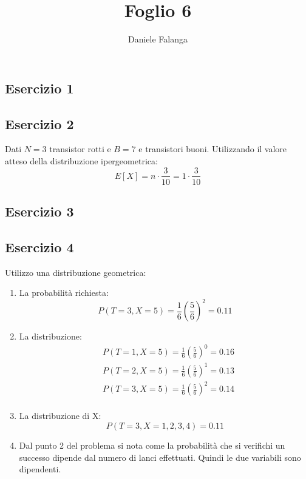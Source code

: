 \documentclass[12pt]{article}
\title{\textbf{Foglio 6}}
\author{Daniele Falanga}
\date{}
\begin{document}
\maketitle

\subsection*{Esercizio 1}

\subsection*{Esercizio 2}

Dati \(N = 3\) transistor rotti e \(B = 7\) e transistori buoni.
Utilizzando il valore atteso della distribuzione ipergeometrica:
\[
E[X] = n \cdot \frac{3}{10} = 1 \cdot \frac{3}{10}    
\] 

\subsection*{Esercizio 3}

\subsection*{Esercizio 4}
Utilizzo una distribuzione geometrica:
\begin{enumerate}
    \item La probabilità richiesta:
    \[
    P(T = 3, X = 5) = \frac{1}{6}\left( \frac{5}{6}\right)^2 = 0.11   
    \]
    \item La distribuzione: 
    \begin{align*}
        &P(T=1, X=5) = \frac{1}{6} \left(\frac{5}{6}\right)^0 = 0.16 \\
        &P(T=2, X=5) = \frac{1}{6} \left(\frac{5}{6}\right)^1 = 0.13 \\
        &P(T=3, X=5) = \frac{1}{6} \left(\frac{5}{6}\right)^2 = 0.14 \\
    \end{align*}
    \item La distribuzione di X:
    \[
        P(T = 3, X=1,2,3,4) = 0.11
    \]
    \item Dal punto 2 del problema si nota come la probabilità che si verifichi un successo dipende dal numero di lanci effettuati.
    Quindi le due variabili sono dipendenti. 
\end{enumerate}
\end{document}
